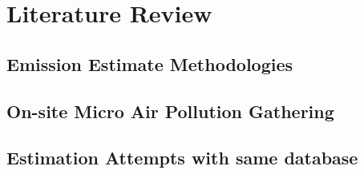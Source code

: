 \chapter{Literature Review}
\label{chap:Style}

\section{Emission Estimate Methodologies}
\section{On-site Micro Air Pollution Gathering}
\section{Estimation Attempts with same database}





